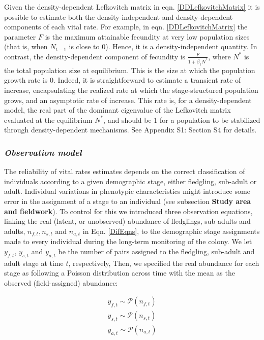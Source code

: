 \documentclass[12pt]{article}
\begin{document}
Given the density-dependent Lefkovitch matrix in eqn. \ref{DDLefkovitchMatrix} it is possible to estimate both the density-independent and density-dependent components of each vital rate. For example, in eqn. \ref{DDLefkovitchMatrix} the parameter ${F}$ is the maximum attainable fecundity at very low population sizes (that is, when $N_{ t-1}$ is close to 0). Hence, it is a density-independent quantity. In contrast, the density-dependent component of fecundity is ${\frac{F}{1+\beta_{1} N^*}}$, where $N^*$ is the total population size at equilibrium. This is the size at which the population growth rate is 0. Indeed, it is straightforward to estimate a transient rate of increase, encapsulating the realized rate at which the stage-structured population grows, and an asymptotic rate of increase. This rate is, for a density-dependent model, the real part of the dominant eigenvalue of the Lefkovitch matrix evaluated at the equilibrium $N^*$, and should be 1 for a population to be stabilized through density-dependent mechanisms. See Appendix S1: Section S4 for details.

\subsubsection*{\textit{Observation model}}

The reliability of vital rates estimates depends on the correct classification of individuals according to a given demographic stage, either fledgling, sub-adult or adult. Individual variations in phenotypic characteristics might introduce some error in the assignment of a stage to an individual (see subsection \textbf{Study area and fieldwork}). To  control for this we introduced three observation equations, linking the real (latent, or unobserved) abundance of fledglings, sub-adults and adults, $n_{f,t}, n_{s,t}$ and $n_{a,t}$ in Eqn. \ref{DifEqns}, to the demographic stage assignments made to every individual during the long-term monitoring of the colony. We let $y_{f,t}$, $y_{s,t}$ and $y_{a,t}$ be the number of pairs assigned to the fledgling, sub-adult and adult stage at time $t$, respectively, Then, we specified the real abundance for each stage as following a Poisson distribution across time with the mean as the observed (field-assigned) abundance:

\begin{equation}\label{ObsEqns}
	\begin{array}
		{l}{y_{f, t} \sim \mathcal{P}(n_{f, t})} \\
		{y_{s, t} \sim \mathcal{P}(n_{s, t})} \\
		{y_{a, t} \sim \mathcal{P}(n_{a, t})}
	\end{array}
\end{equation}
\end{document}
